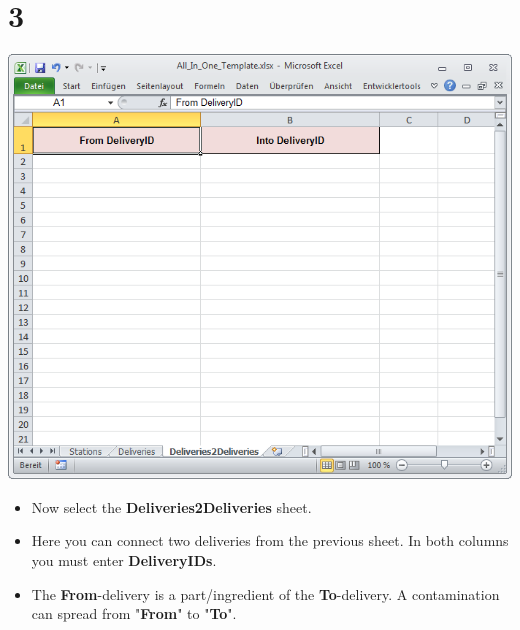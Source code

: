 \documentclass{beamer}
\begin{document}
\section{3}
\begin{frame}
	\begin{center}
  		\includegraphics[height=0.6\textheight]{3.png}
	\end{center}
	\begin{itemize}
		\item Now select the \textbf{Deliveries2Deliveries} sheet.
		\item Here you can connect two deliveries from the previous sheet. In both columns you must enter \textbf{DeliveryIDs}.
		\item The \textbf{From}-delivery is a part/ingredient of the \textbf{To}-delivery. A contamination can spread from "\textbf{From}" to "\textbf{To}".
	\end{itemize}
\end{frame}
\end{document}

